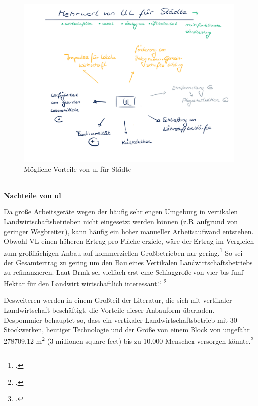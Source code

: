 \documentclass{scrartcl}
\begin{document}
\begin{figure}[htbp]
\centering
\includegraphics[width=14cm]{image_folder/moeglicheVorteileUL.png}
\caption{Mögliche Vorteile von \acs{ul} für Städte}
\label{fig:MoeglicheVorteilevonUL}
\end{figure}

\\


     
\textbf{Nachteile von \acs{ul}}

Da große Arbeitsgeräte wegen der häufig sehr engen Umgebung in vertikalen Landwirtschaftsbetrieben nicht eingesetzt werden können (z.B. aufgrund von geringer Wegbreiten), kann häufig ein hoher manueller Arbeitsaufwand entstehen.
Obwohl VL einen höheren Ertrag pro Fläche erziele, wäre der Ertrag im Vergleich zum großflächigen Anbau auf kommerziellen Großbetrieben nur gering.\footcite[Vgl.][S.8f]{BRINK2002LandwirtschaftsprogrammHannover} So sei der Gesamtertrag zu gering um den Bau eines Vertikalen Landwirtschaftsbetriebs zu refinanzieren. Laut Brink sei vielfach erst eine Schlaggröße von vier bis fünf Hektar für den Landwirt wirtschaftlich interessant.“ \footcites[S.27]{Schulz2013UrbaneLandmanagements}[zitiert nach]{STADTENTWICKLUNG2010OffenerLandwirtschaft}

Desweiteren werden in einem Großteil der Literatur, die sich mit vertikaler Landwirtschaft beschäftigt, die Vorteile dieser Anbauform überladen. 
Despommier behauptet so, dass ein vertikaler Landwirtschaftsbetrieb mit 30 Stockwerken, heutiger Technologie und der Größe von einem Block von ungefähr 278709,12 m\textsuperscript{2} (3 millionen square feet) bis zu 10.000 Menschen versorgen könnte.\footcite{Despommier2010TheCentury.}
\end{document}
